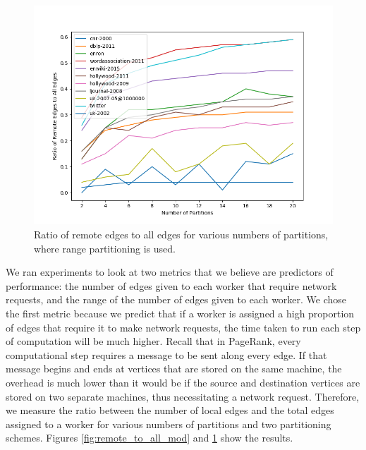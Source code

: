 \begin{figure}[!t]
	\centering
	\includegraphics[width=\columnwidth]{../good_plots/remote_to_all_chunked.png}
	\caption{Ratio of remote edges to all edges for various numbers of 
		partitions, where range partitioning is used.}
	\label{fig:remote_to_all_range}
\end{figure}

We ran experiments to look at two metrics that we believe are predictors of 
performance: the number of edges given to each worker that require network 
requests, and the range of the number of edges given to each worker. We chose 
the first metric because we predict that if a worker is assigned a high 
proportion of edges that require it to make network requests, the time taken to 
run each step of computation will be much higher. Recall that in PageRank, 
every computational step requires a message to be sent along every edge. If 
that message begins and ends at vertices that are stored on the same machine, 
the overhead is much lower than it would be if the source and destination 
vertices are stored on two separate machines, thus necessitating a network 
request. Therefore, we measure the ratio between the number of local edges and 
the total edges assigned to a worker for various numbers of partitions and two 
partitioning schemes. Figures \ref{fig:remote_to_all_mod} and 
\ref{fig:remote_to_all_range} show the results.

